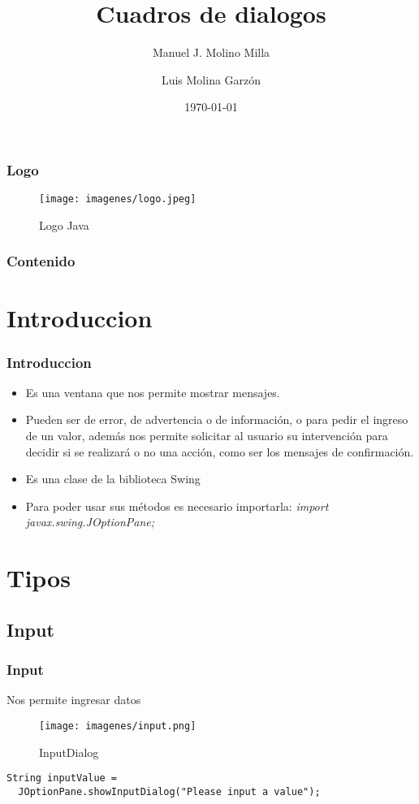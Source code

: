 \documentclass{beamer}
\title{Cuadros de dialogos}
\author{Manuel J. Molino Milla \and Luis Molina Garzón}
\date{\today} %
\institute{IES Virgen del Carmen \and Departamento de Informática}
\begin{document}
\begin{frame}
  \titlepage
\end{frame}

\begin{frame}
    \frametitle{Logo}
\begin{figure}
\texttt{[image: imagenes/logo.jpeg]} 
\caption{Logo Java}
\end{figure}
\end{frame}

\begin{frame}
  \frametitle{Contenido}
  \tableofcontents[pausesections]
\end{frame}



\section{Introduccion}

\begin{frame}
    \frametitle{Introduccion}

\begin{itemize}[<+-| alert@+>]
      \item Es una ventana que nos permite mostrar mensajes.
      \item Pueden ser de error, de advertencia o de información, o para pedir el ingreso de un valor, además nos permite solicitar al usuario su intervención para decidir si se realizará o no una acción, como ser los mensajes de confirmación.
      \item Es una clase de la biblioteca Swing      
      \item Para poder usar sus métodos es necesario importarla: \emph{import javax.swing.JOptionPane;}
      \end{itemize}
      \pause
\end{frame}

\section{Tipos}
\subsection{Input}

\begin{frame}[fragile]
    \frametitle{Input}
Nos permite ingresar datos
    \begin{figure}
\texttt{[image: imagenes/input.png]}
\caption{InputDialog}
\end{figure}
\pause
 \begin{verbatim}
String inputValue = 
  JOptionPane.showInputDialog("Please input a value"); 
\end{verbatim}
\end{frame}
\end{document}
